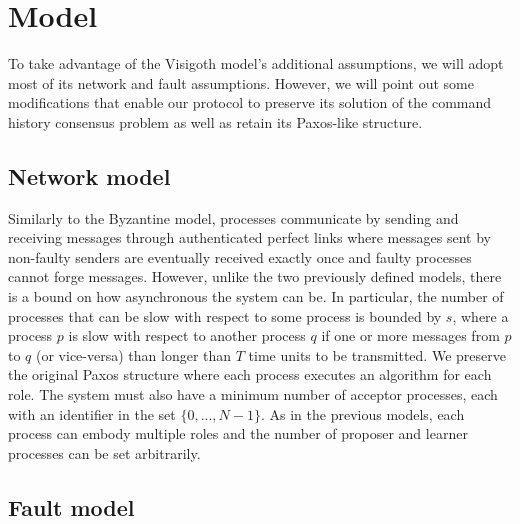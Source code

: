 \section{Model} \label{vft_model}
To take advantage of the Visigoth model's additional assumptions, we will adopt most of its network and fault assumptions. However, we will point out some modifications that enable our protocol to preserve its solution of the command history consensus problem as well as retain its Paxos-like structure. 

\subsection{Network model}

Similarly to the Byzantine model, processes communicate by sending and receiving messages through authenticated perfect links where messages sent by non-faulty senders are eventually received exactly once and faulty processes cannot forge messages. However, unlike the two previously defined models, there is a bound on how asynchronous the system can be. In particular, the number of processes that can be slow with respect to some process is bounded by $s$, where a process $p$ is slow with respect to another process $q$ if one or more messages from $p$ to $q$ (or vice-versa) than longer than $T$ time units to be transmitted. We preserve the original Paxos structure where each process executes an algorithm for each role. The system must also have a minimum number of acceptor processes, each with an identifier in the set $\{0,...,N-1\}$. As in the previous models, each process can embody multiple roles and the number of proposer and learner processes can be set arbitrarily.

\subsection{Fault model}


